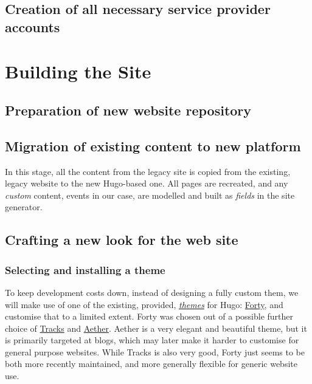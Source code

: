 \documentclass{article}
\begin{document}
\subsection{Creation of all necessary service provider accounts}
\label{sec:orgb661e38}

\section{Building the Site}
\label{sec:org7124ad8}

\subsection{Preparation of new website repository}
\label{sec:org0ddd042}


\subsection{Migration of existing content to new platform}
\label{sec:orgdf4a8a0}
In this stage, all the content from the legacy site is copied from the existing,
legacy website to the new Hugo-based one. All pages are recreated, and any
\emph{custom} content, events in our case, are modelled and built as \emph{fields} in the
site generator.


\subsection{Crafting a new look for the web site}
\label{sec:org9e5e51e}

\subsubsection{Selecting and installing a theme}
\label{sec:org7f8f946}
To keep development costs down, instead of designing a fully custom them, we
will make use of one of the existing, provided, \emph{\href{https://themes.gohugo.io/aether/}{themes}} for Hugo: \href{https://themes.gohugo.io/forty/}{Forty}, and customise
that to a limited extent. Forty was chosen out of a possible further choice of
\href{https://themes.gohugo.io/hugo-tracks-theme/}{Tracks} and \href{https://themes.gohugo.io/aether/}{Aether}. Aether is a very elegant and beautiful theme, but it is
primarily targeted at blogs, which may later make it harder to customise for
general purpose websites. While Tracks is also very good, Forty just seems to be
both more recently maintained, and more generally flexible for generic website
use.
\end{document}
